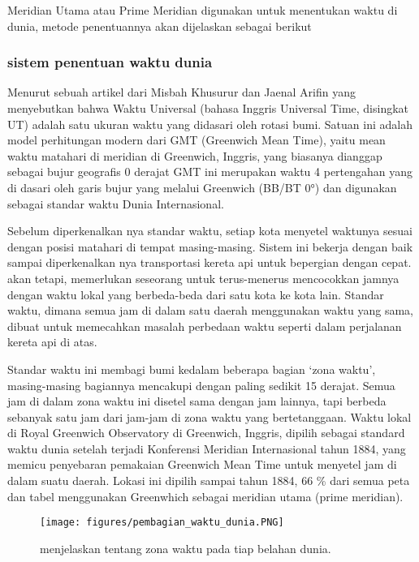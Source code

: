 	Meridian Utama atau Prime Meridian digunakan untuk menentukan waktu di dunia, metode penentuannya akan dijelaskan sebagai berikut


\subsubsection{sistem penentuan waktu dunia}
	

	Menurut sebuah artikel dari Misbah Khusurur dan Jaenal Arifin yang menyebutkan bahwa Waktu Universal (bahasa Inggris Universal Time, disingkat UT)
adalah satu ukuran waktu yang didasari oleh rotasi bumi. Satuan ini adalah model perhitungan modern dari GMT (Greenwich Mean Time), yaitu mean waktu matahari 
di meridian di Greenwich, Inggris, yang biasanya dianggap sebagai bujur geografis 0 derajat GMT ini merupakan waktu 4 pertengahan yang di dasari oleh 
garis bujur yang melalui Greenwich (BB/BT 0°) dan digunakan sebagai standar waktu Dunia Internasional.

	
	Sebelum diperkenalkan nya standar waktu, setiap kota menyetel waktunya sesuai dengan posisi matahari di tempat masing-masing. Sistem ini bekerja 
dengan baik sampai diperkenalkan nya transportasi kereta api untuk bepergian dengan cepat. akan tetapi, memerlukan seseorang untuk terus-menerus mencocokkan 
jamnya dengan waktu lokal yang berbeda-beda dari satu kota ke kota lain. Standar waktu, dimana semua jam di dalam satu daerah menggunakan waktu yang sama, 
dibuat untuk memecahkan masalah perbedaan waktu seperti dalam perjalanan kereta api di atas.


	Standar waktu ini membagi bumi kedalam beberapa bagian `zona waktu', masing-masing bagiannya mencakupi dengan paling sedikit 15 derajat. Semua jam di dalam
zona waktu ini disetel sama dengan jam lainnya, tapi berbeda sebanyak satu jam dari jam-jam di zona waktu yang bertetanggaan. 
Waktu lokal di Royal Greenwich Observatory di Greenwich, Inggris, dipilih sebagai standard waktu dunia setelah terjadi 
Konferensi Meridian Internasional tahun 1884, yang memicu penyebaran pemakaian Greenwich Mean Time untuk menyetel jam di dalam suatu daerah. 
Lokasi ini dipilih sampai tahun 1884, 66 \% dari semua peta dan tabel menggunakan Greenwhich sebagai meridian utama (prime meridian).


\begin{figure}[ht]
\centerline{\texttt{[image: figures/pembagian\_waktu\_dunia.PNG]}}
\caption{menjelaskan tentang zona waktu pada tiap belahan dunia.}
\label{pembagian_waktu_dunia}
\end{figure}

